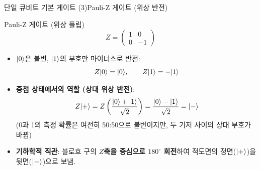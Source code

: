 \documentclass[aspectratio=169, 10pt]{beamer}
\begin{document}
\begin{frame}{단일 큐비트 기본 게이트 (3)}{Pauli-Z 게이트 (위상 반전)}
    \begin{block}{Pauli-Z 게이트 (위상 플립)}
        $$Z = \begin{pmatrix} 1 & 0 \\ 0 & -1 \end{pmatrix}$$ \pause
        \begin{itemize}
            \item $|0\rangle$은 불변, $|1\rangle$의 부호만 마이너스로 반전:
            $$Z|0\rangle = |0\rangle, \qquad Z|1\rangle = -|1\rangle$$ \pause
            \item \textbf{중첩 상태에서의 역할 (상대 위상 반전)}:
            $$Z|+\rangle = Z\left(\frac{|0\rangle+|1\rangle}{\sqrt{2}}\right) = \frac{|0\rangle-|1\rangle}{\sqrt{2}} = |-\rangle$$
            \scriptsize (0과 1의 측정 확률은 여전히 50:50으로 불변이지만, 두 기저 사이의 상대 부호가 바뀜) \normalsize
            \item \textbf{기하학적 직관}: 블로흐 구의 \textbf{$Z$축을 중심으로 $180^\circ$ 회전}하여 적도면의 정면($|+\rangle$)을 뒷면($|-\rangle$)으로 보냄.
        \end{itemize}
    \end{block}
\end{frame}
\end{document}
